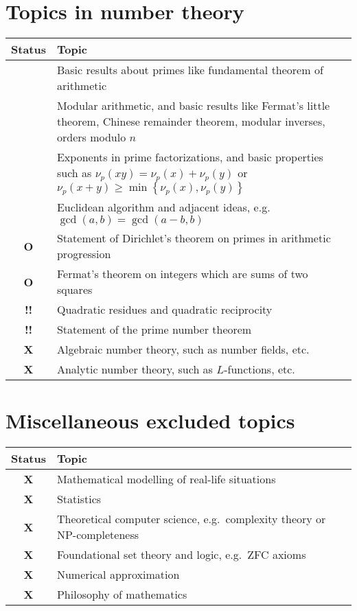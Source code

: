 \documentclass[11pt]{scrartcl}
\providecommand{\isRq}{{\color{green!60!black}\CheckmarkBold}}
\providecommand{\isUs}{{\color{cyan}\sffamily\bfseries O}}
\providecommand{\isAv}{{\color{gray}\sffamily\bfseries !!}}
\providecommand{\isEx}{{\color{red}\sffamily\bfseries X}}
\begin{document}
\section{Topics in number theory}
\begin{center}
  \begin{tabular}{cp{12cm}}
  \toprule Status & Topic \\ \midrule
  \isRq & Basic results about primes like fundamental theorem of arithmetic \\
  \isRq & Modular arithmetic, and basic results like Fermat's little theorem,
    Chinese remainder theorem, modular inverses, orders modulo $n$ \\
  \isRq & Exponents in prime factorizations,
    and basic properties such as $\nu_p(xy) = \nu_p(x) + \nu_p(y)$
    or $\nu_p(x+y) \ge \min \left\{ \nu_p(x), \nu_p(y) \right\}$ \\
  \isRq & Euclidean algorithm and adjacent ideas,
    e.g.\ $\gcd(a,b) = \gcd(a-b,b)$ \\
  \isUs & Statement of Dirichlet's theorem on primes in arithmetic progression \\
  \isUs & Fermat's theorem on integers which are sums of two squares \\
  \isAv & Quadratic residues and quadratic reciprocity \\
  \isAv & Statement of the prime number theorem \\
  \isEx & Algebraic number theory, such as number fields, etc. \\
  \isEx & Analytic number theory, such as $L$-functions, etc. \\
  \bottomrule
  \end{tabular}
\end{center}

\section{Miscellaneous excluded topics}
\begin{center}
  \begin{tabular}{cp{12cm}}
  \toprule Status & Topic \\ \midrule
  \isEx & Mathematical modelling of real-life situations \\
  \isEx & Statistics \\
  \isEx & Theoretical computer science, e.g.\ complexity theory or NP-completeness \\
  \isEx & Foundational set theory and logic, e.g.\ ZFC axioms \\
  \isEx & Numerical approximation \\
  \isEx & Philosophy of mathematics \\
  \bottomrule
  \end{tabular}
\end{center}
\end{document}
